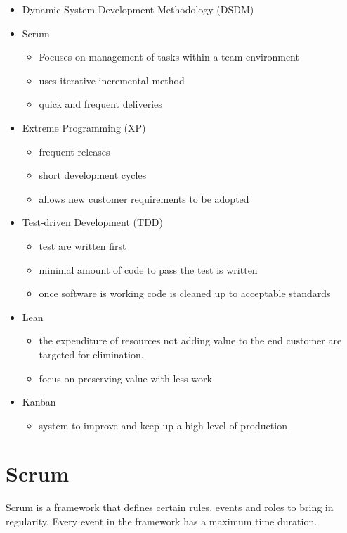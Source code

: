 \documentclass{article}
\begin{document}
\begin{itemize}
  \item Dynamic System Development Methodology (DSDM)
  \item Scrum
    \begin{itemize}
      \item Focuses on management of tasks within a team environment
      \item uses iterative incremental method
      \item quick and frequent deliveries
    \end{itemize}
  \item Extreme Programming (XP)
    \begin{itemize}
      \item frequent releases
      \item short development cycles
      \item allows new customer requirements to be adopted
    \end{itemize}
  \item Test-driven Development (TDD)
    \begin{itemize}
      \item test are written first
      \item minimal amount of code to pass the test is written
      \item once software is working code is cleaned up to acceptable standards
    \end{itemize}
  \item Lean
    \begin{itemize}
      \item the expenditure of resources not adding value to the end customer
            are targeted for elimination.
      \item focus on preserving value with less work
    \end{itemize}
  \item Kanban
    \begin{itemize}
      \item system to improve and keep up a high level of production
    \end{itemize}
\end{itemize}

\section{Scrum}
Scrum is a framework that defines certain rules, events and roles to bring in
regularity. Every event in the framework has a maximum time duration.
\end{document}
